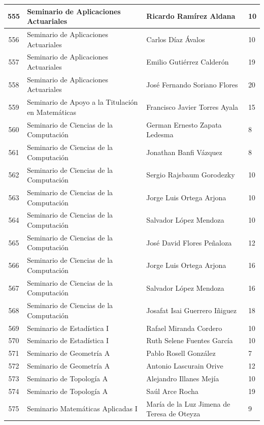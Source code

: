 {\begin{longtable}{|c|p{6.5cm}|p{5cm}|p{1.5cm}|}
  555 & Seminario de Aplicaciones Actuariales & Ricardo Ramírez Aldana & 10 \\ \hline
  556 & Seminario de Aplicaciones Actuariales & Carlos Díaz Ávalos & 10 \\ \hline
  557 & Seminario de Aplicaciones Actuariales & Emilio Gutiérrez Calderón & 19 \\ \hline
  558 & Seminario de Aplicaciones Actuariales & José Fernando Soriano Flores & 20 \\ \hline
  559 & Seminario de Apoyo a la Titulación en Matemáticas & Francisco Javier Torres Ayala & 15 \\ \hline
  560 & Seminario de Ciencias de la Computación & German Ernesto Zapata Ledesma & 8 \\ \hline
  561 & Seminario de Ciencias de la Computación & Jonathan Banfi Vázquez & 8 \\ \hline
  562 & Seminario de Ciencias de la Computación & Sergio Rajsbaum Gorodezky & 10 \\ \hline
  563 & Seminario de Ciencias de la Computación & Jorge Luis Ortega Arjona & 10 \\ \hline
  564 & Seminario de Ciencias de la Computación & Salvador López Mendoza & 10 \\ \hline
  565 & Seminario de Ciencias de la Computación & José David Flores Peñaloza & 12 \\ \hline
  566 & Seminario de Ciencias de la Computación & Jorge Luis Ortega Arjona & 16 \\ \hline
  567 & Seminario de Ciencias de la Computación & Salvador López Mendoza & 16 \\ \hline
  568 & Seminario de Ciencias de la Computación & Josafat Isai Guerrero Iñiguez & 18 \\ \hline
  569 & Seminario de Estadística I & Rafael Miranda Cordero & 10 \\ \hline
  570 & Seminario de Estadística I & Ruth Selene Fuentes García & 10 \\ \hline
  571 & Seminario de Geometría A & Pablo Rosell González & 7 \\ \hline
  572 & Seminario de Geometría A & Antonio Lascurain Orive & 12 \\ \hline
  573 & Seminario de Topología A & Alejandro Illanes Mejía & 10 \\ \hline
  574 & Seminario de Topología A & Saúl Arce Rocha & 19 \\ \hline
  575 & Seminario Matemáticas Aplicadas I & María de la Luz Jimena de Teresa de Oteyza & 9 \\ \hline

\end{longtable}}

